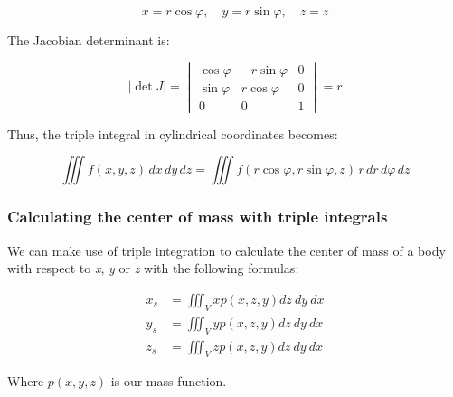 \[
    x = r \cos \varphi, \quad y = r \sin \varphi, \quad z = z
\]

The Jacobian determinant is:

\[
    \left| \det J \right| =
    \begin{vmatrix}
    \cos \varphi & -r \sin \varphi & 0 \\
    \sin \varphi & r \cos \varphi & 0 \\
    0 & 0 & 1
    \end{vmatrix}
    = r
\]

Thus, the triple integral in cylindrical coordinates becomes:

\[
    \iiint f(x, y, z)\, dx\, dy\, dz = \iiint f(r \cos \varphi, r \sin \varphi, z)\, r\, dr\, d\varphi\, 
    dz
\]

\subsubsection{Calculating the center of mass with triple integrals}

We can make use of triple integration to calculate the center of mass of a body with
respect to \emph{x}, \emph{y} or \emph{z} with the following formulas:

\begin{align*}
    x_s &= \iiint_V xp(x,z,y)dz\ dy \ dx\\
    y_s &= \iiint_V yp(x,z,y)dz\ dy \ dx\\
    z_s &= \iiint_V zp(x,z,y)dz\ dy \ dx
\end{align*}

Where \(p(x,y,z)\) is our mass function.
